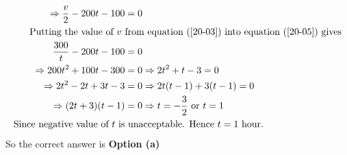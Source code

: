 \begin{enumerate}
\begin{answer}
\begin{align}
	\Rightarrow \frac{v}{2}-200 t-100&=0\label{20-05}\\
\text{	Putting the value of $v$ }&\text{from equation (\ref{20-03}) into equation (\ref{20-05}) gives}\notag\\
	\frac{300}{t}-200 t-100&=0 \notag\\
	\Rightarrow 200 t^{2}+100 t-300&=0 \Rightarrow 2 t^{2}+t-3=0 \notag\\
	\Rightarrow 2 t^{2}-2 t+3 t-3&=0 \Rightarrow 2 t(t-1)+3(t-1)=0 \notag\\
	\Rightarrow(2 t+3)(t-1)&=0 \Rightarrow t=-\frac{3}{2} \text { or } t=1\notag\\
	\text{Since negative value of $t$ is}&\text{ unacceptable. Hence $t=1$ hour.}\notag
	\end{align}
		So the correct answer is \textbf{Option (a)}
\end{answer}

\end{enumerate}
